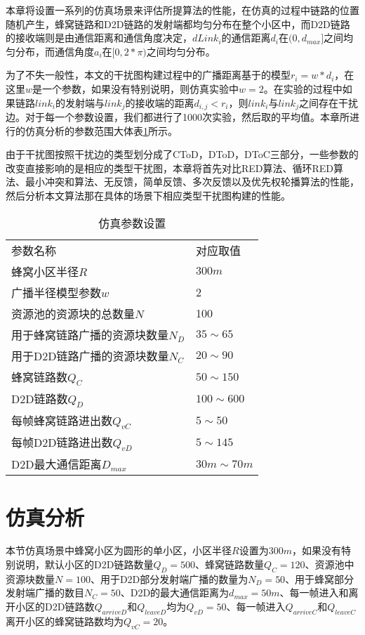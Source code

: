 \documentclass[figurelist,tablelist,algorithmlist,nomlist,masters]{seuthesix}
\begin{document}
	
	本章将设置一系列的仿真场景来评估所提算法的性能，在仿真的过程中链路的位置随机产生，蜂窝链路和D2D链路的发射端都均匀分布在整个小区中，而D2D链路的接收端则是由通信距离和通信角度决定，$dLink_i$的通信距离$d_i$在$(0,d_{max}]$之间均匀分布，而通信角度$a_i$在$[0,2*\pi )$之间均匀分布。
	
	为了不失一般性，本文的干扰图构建过程中的广播距离基于的模型$r_i = w * d_i$，在这里$w$是一个参数，如果没有特别说明，则仿真实验中$w = 2$。在实验的过程中如果链路$link_i$的发射端与$link_j$的接收端的距离$d_{i,j} <　r_i$，则$link_i$与$link_j$之间存在干扰边。对于每一个参数设置，我们都进行了1000次实验，然后取的平均值。本章所进行的仿真分析的参数范围大体表\ref{tab:4.1}所示。
	
	由于干扰图按照干扰边的类型划分成了CToD，DToD，DToC三部分，一些参数的改变直接影响的是相应的类型干扰图，本章将首先对比RED算法、循环RED算法、最小冲突和算法、无反馈，简单反馈、多次反馈以及优先权轮播算法的性能，然后分析本文算法那在具体的场景下相应类型干扰图构建的性能。
	
	\begin{table}[!h]
		\caption{\textsc{仿真参数设置} \label{tab:4.1}}
		\centering
		\begin{tabular}[t]{p{250pt}p{80pt}}
			\hline\noalign{\smallskip}
			参数名称							&             对应取值		\\
			\noalign{\smallskip}\hline\noalign{\smallskip}
			蜂窝小区半径$R$						&			$300m $         \\
			广播半径模型参数$w$					&			2		        \\
			资源池的资源块的总数量$N$			&			100				\\
			用于蜂窝链路广播的资源块数量$N_D$	&			$35 \sim 65$			\\
			用于D2D链路广播的资源块数量$N_C$	&			$20 \sim 90$			\\
			蜂窝链路数$Q_C$						&			$50 \sim 150$ 		\\
			D2D链路数$Q_D$						&			$100 \sim 600$		\\
			每帧蜂窝链路进出数$Q_{vC}$			&			$5 \sim 50$			\\
			每帧D2D链路进出数$Q_{vD}$			&			$5 \sim 145$			\\
			D2D最大通信距离$D_{max}$			&			$30m \sim 70m$     	\\
			\hline
		\end{tabular}
	\end{table}
	
	\section{仿真分析}
	本节仿真场景中蜂窝小区为圆形的单小区，小区半径$R$设置为$300m$，如果没有特别说明，默认小区的D2D链路数量$Q_D = 500$、蜂窝链路数量$Q_C = 120$、资源池中资源块数量$N = 100$、用于D2D部分发射端广播的数量为$N_D = 50$、用于蜂窝部分发射端广播的数目$N_C = 50$、D2D的最大通信距离为$d_{max} = 50m$、每一帧进入和离开小区的D2D链路数$Q_{arriveD}$和$Q_{leaveD}$均为$Q_{vD} = 50$、每一帧进入$Q_{arriveC}$和$Q_{leaveC}$离开小区的蜂窝链路数均为$Q_{vC} = 20$。
	
\end{document}
